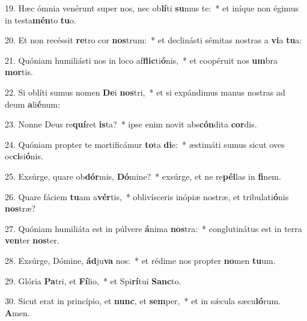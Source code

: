 19. Hæc ómnia venérunt super nos, nec ob\textbf{lí}ti \textbf{su}mus te:~*  et iníque non égimus in testa\textbf{mén}to \textbf{tu}o.\

20. Et non recéssit \textbf{re}tro cor \textbf{nos}trum:~*  et declinásti sémitas nostras a \textbf{vi}a \textbf{tu}a:\

21. Quóniam humiliásti nos in loco af\textbf{flic}ti\textbf{ó}nis,~*  et coopéruit nos \textbf{um}bra \textbf{mor}tis.\

22. Si oblíti sumus nomen \textbf{De}i \textbf{nos}tri,~*  et si expándimus manus nostras ad deum \textbf{a}li\textbf{é}num:\

23. Nonne Deus re\textbf{quí}ret \textbf{is}ta?~*  ipse enim novit abs\textbf{cón}dita \textbf{cor}dis.\

24. Quóniam propter te mortificámur \textbf{to}ta \textbf{di}e:~*  æstimáti sumus sicut oves oc\textbf{ci}si\textbf{ó}nis.\

25. Exsúrge, quare ob\textbf{dór}mis, \textbf{Dó}mine?~*  exsúrge, et ne re\textbf{pél}las in \textbf{fi}nem.\

26. Quare fáciem \textbf{tu}am a\textbf{vér}tis,~*  oblivísceris inópiæ nostræ, et tribulati\textbf{ó}nis \textbf{nos}træ?\

27. Quóniam humiliáta est in púlvere \textbf{á}nima \textbf{nos}tra:~*  conglutinátus est in terra \textbf{ven}ter \textbf{nos}ter.\

28. Exsúrge, Dómine, \textbf{ád}ju\textbf{va} nos:~*  et rédime nos propter \textbf{no}men \textbf{tu}um.\

29. Glória \textbf{Pa}tri, et \textbf{Fí}lio,~*  et Spi\textbf{rí}tui \textbf{Sanc}to.\

30. Sicut erat in princípio, et \textbf{nunc}, et \textbf{sem}per,~*  et in sǽcula sæcu\textbf{ló}rum. \textbf{A}men.\

